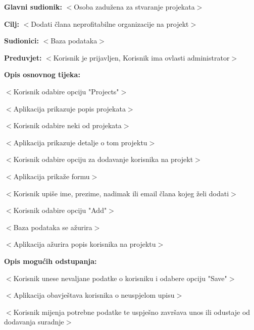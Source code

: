 						\noindent {}
					\begin{packed_item}

						\item \textbf{Glavni sudionik:} $<$Osoba zadužena za stvaranje projekata$>$
						\item \textbf{Cilj:} $<$Dodati člana neprofitabilne organizacije na projekt$>$
						\item \textbf{Sudionici:} $<$Baza podataka$>$
						\item \textbf{Preduvjet:} $<$Korisnik je prijavljen, Korisnik ima ovlasti administrator$>$
						\item \textbf{Opis osnovnog tijeka:}
					
						\item[] \begin{packed_enum}
					
							\item $<$Korisnik odabire opciju "Projects"$>$
							\item $<$Aplikacija prikazuje popis projekata$>$
							\item $<$Korisnik odabire neki od projekata$>$
							\item $<$Aplikacija prikazuje detalje o tom projektu$>$
							\item $<$Korisnik odabire opciju za dodavanje korisnika na projekt$>$
							\item $<$Aplikacija prikaže formu$>$
							\item $<$Korisnik upiše ime, prezime, nadimak ili email člana kojeg želi dodati$>$
							\item $<$Korisnik odabire opciju "Add"$>$
							\item $<$Baza podataka se ažurira$>$
							\item $<$Aplikacija ažurira popis korisnika na projektu$>$
						\end{packed_enum}
					
						\item \textbf{Opis mogućih odstupanja:}
					
						\item[] \begin{packed_item}
                        
                        	\item[7.b] $<$Korisnik unese nevaljane podatke o korisniku i odabere opciju "Save"$>$
							\item[] \begin{packed_enum}

								\item $<$Aplikacija obavještava korisnika o neuspjelom upisu$>$
								\item $<$Korisnik mijenja potrebne podatke te uspješno završava unos ili
								odustaje od dodavanja suradnje$>$

							\end{packed_enum}
					
						\end{packed_item}
					\end{packed_item}

